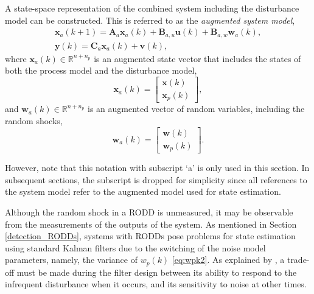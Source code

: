 {{A state-space representation of the combined system including the disturbance model can be constructed. This is referred to as the \textit{augmented system model},
\begin{equation} \label{eq:ss_rep_xa}
	\begin{aligned}
		\mathbf{x}_a(k+1) = \mathbf{A}_a \mathbf{x}_a(k) + \mathbf{B}_{a,u} \mathbf{u}(k) + \mathbf{B}_{a,w} \mathbf{w}_{a}(k), \\
		\mathbf{y}(k) = \mathbf{C}_a \mathbf{x}_a(k) + \mathbf{v}(k),
	\end{aligned}
\end{equation}
where $\mathbf{x}_a(k) \in \mathbb{R}^{n+n_p}$ is an augmented state vector that includes the states of both the process model and the disturbance model, 
\begin{equation} \label{eq:xak}
	\mathbf{x}_a(k) = \begin{bmatrix}
		\mathbf{x}(k) \\
		\mathbf{x}_p(k)
	\end{bmatrix},
\end{equation}
and $\mathbf{w}_a(k) \in \mathbb{R}^{n+n_p}$ is an augmented vector of random variables, including the random shocks,
\begin{equation} \label{eq:wak}
	\mathbf{w}_a(k) = \begin{bmatrix}
		\mathbf{w}(k) \\
		\mathbf{w}_p(k)
	\end{bmatrix}.
\end{equation}

However, note that this notation with subscript `a' is only used in this section. In subsequent sections, the subscript is dropped for simplicity since all references to the system model refer to the augmented model used for state estimation.

Although the random shock in a \gls{RODD} is unmeasured, it may be observable from the measurements of the outputs of the system. As mentioned in Section \ref{detection_RODDs}, systems with \gls{RODD}s pose problems for state estimation using standard Kalman filters due to the switching of the noise model parameters, namely, the variance of $w_p(k)$ \eqref{eq:wpk2}. As explained by \cite{andersson_adaptive_1985}, a trade-off must be made during the filter design between its ability to respond to the infrequent disturbance when it occurs, and its sensitivity to noise at other times.


}}
